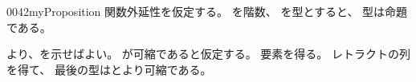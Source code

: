 \documentclass[index]{subfiles}
\begin{document}
\begin{myBlock}{0042}{myProposition}
  関数外延性を仮定する。
  を階数、
  を型とすると、
  型は命題である。
\end{myBlock}
\StartDefiningTabulars
\begin{myProof}
  より、を示せばよい。
  が可縮であると仮定する。
  要素を得る。
  レトラクトの列
  を得て、
  最後の型はとより可縮である。
\end{myProof}
\StopDefiningTabulars
\end{document}
